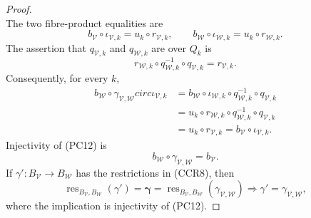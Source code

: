 \begin{proof}
\[  \]
  The two fibre-product equalities are
  \[
    b_{\mathcal V}\circ\iota_{\mathcal V,k}
      =u_k\circ r_{\mathcal V,k},\qquad
    b_{\mathcal W}\circ\iota_{\mathcal W,k}
      =u_k\circ r_{\mathcal W,k}.                                \tag{CCR10a}
  \]
  The assertion that $q_{\mathcal V,k}$ and $q_{\mathcal W,k}$ are over
  $Q_k$ is
  \[
    r_{\mathcal W,k}\circ q_{\mathcal W,k}^{-1}\circ
      q_{\mathcal V,k}=r_{\mathcal V,k}.
  \]
  Consequently, for every $k$,
  \[
  \begin{aligned}
    b_{\mathcal W}\circ\gamma_{\mathcal V,\mathcal W}circ
      \iota_{\mathcal V,k}
      &=b_{\mathcal W}\circ\iota_{\mathcal W,k}\circ
        q_{\mathcal W,k}^{-1}\circ q_{\mathcal V,k}\\
      &=u_k\circ r_{\mathcal W,k}\circ
        q_{\mathcal W,k}^{-1}\circ q_{\mathcal V,k}\\
      &=u_k\circ r_{\mathcal V,k}
       =b_{\mathcal V}\circ\iota_{\mathcal V,k}.
  \end{aligned}
  \]
  Injectivity of (PC12) is
  \[
    b_{\mathcal W}\circ\gamma_{\mathcal V,\mathcal W}
      =b_{\mathcal V}.                                           \tag{CCR11}
  \]
  If $\gamma'\colon B_{\mathcal V}\to B_{\mathcal W}$ has the restrictions
  in (CCR8), then
  \[
    \operatorname{res}_{B_{\mathcal V},B_{\mathcal W}}(\gamma')
      =\boldsymbol\gamma
      =\operatorname{res}_{B_{\mathcal V},B_{\mathcal W}}
        (\gamma_{\mathcal V,\mathcal W})
      \Longrightarrow
      \gamma'=\gamma_{\mathcal V,\mathcal W},                   \tag{CCR12}
  \]
  where the implication is injectivity of (PC12).
\end{proof}

